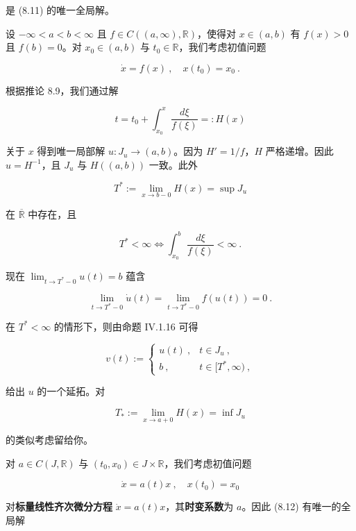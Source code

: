 \begin{example}
\begin{items}
是 (8.11) 的唯一全局解。

\item

设 $ -\infty<a<b<\infty $ 且 $ f\in C((a,\infty),\mathbb{R}) $，使得对 $ x\in(a,b) $ 有 $ f(x)>0 $ 且 $ f(b)=0 $。对 $ x_{0}\in(a,b) $ 与 $ t_{0}\in\mathbb{R} $，我们考虑初值问题

\[
\dot{x}=f(x)\ ,\quad x(t_{0})=x_{0} \ .
\]

根据推论 8.9，我们通过解

\[
t=t_{0}+\int_{x_{0}}^{x}\frac{d\xi}{f(\xi)}=:H(x)
\]

关于 $ x $ 得到唯一局部解 $ u:J_{u}\to(a,b) $。因为 $ H'=1/f $，$ H $ 严格递增。因此 $ u=H^{-1} $，且 $ J_{u} $ 与 $ H((a,b)) $ 一致。此外

\[
T^{*}:=\lim_{x\to b-0}H(x)=\sup J_{u}
\]

在 $ \overline{\mathbb{R}} $ 中存在，且

\[
T^{*}<\infty\iff\int_{x_{0}}^{b}\frac{d\xi}{f(\xi)}<\infty \ .
\]
\end{items}


现在 $ \lim_{t\to T^{*}-0}u(t)=b $ 蕴含

\[
\lim_{t\to T^{*}-0}\dot{u}(t)=\lim_{t\to T^{*}-0}f(u(t))=0 \ .
\]

在 $ T^{*}<\infty $ 的情形下，则由命题 IV.1.16 可得

\begin{equation*}
v(t):=\begin{cases}u(t)\ , & t\in J_{u}\ ,\\ b\ , & t\in[T^{*},\infty)\ ,\end{cases}
\end{equation*}

给出 $ u $ 的一个延拓。对

\[
T_{*}:=\lim_{x\to a+0}H(x)=\inf J_{u}
\]

的类似考虑留给你。

\begin{items}
\item[（e）]

对 $ a\in C(J,\mathbb{R}) $ 与 $ (t_{0},x_{0})\in J\times\mathbb{R} $，我们考虑初值问题

\begin{equation}
\dot{x}=a(t)x\ ,\quad x(t_{0})=x_{0}\tag{8.12}
\end{equation}

对\textbf{标量线性齐次微分方程} $ \dot{x}=a(t)x $，其\textbf{时变系数}为 $ a $。因此 (8.12) 有唯一的全局解


\end{items}
\end{example}
